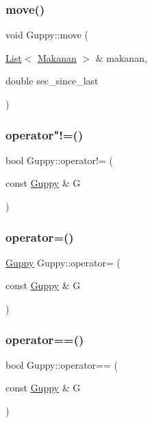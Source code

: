 \mbox{\label{class_guppy_ac6ca65d23a87ab54f0b82f5c45082776}} 
\subsubsection{\texorpdfstring{move()}{move()}}
{\footnotesize\ttfamily void Guppy\+::move (\begin{DoxyParamCaption}\item[{\mbox{\hyperlink{class_list}{List}}$<$ \mbox{\hyperlink{class_makanan}{Makanan}} $>$ \&}]{makanan,  }\item[{double}]{sec\+\_\+since\+\_\+last }\end{DoxyParamCaption})}

\mbox{\label{class_guppy_aa872357ac2df872e8b748066d6b79556}} 
\subsubsection{\texorpdfstring{operator"!=()}{operator!=()}}
{\footnotesize\ttfamily bool Guppy\+::operator!= (\begin{DoxyParamCaption}\item[{const \mbox{\hyperlink{class_guppy}{Guppy}} \&}]{G }\end{DoxyParamCaption})}

\mbox{\label{class_guppy_aa30f6db726124f670123daadb53a581f}} 
\subsubsection{\texorpdfstring{operator=()}{operator=()}}
{\footnotesize\ttfamily \mbox{\hyperlink{class_guppy}{Guppy}} Guppy\+::operator= (\begin{DoxyParamCaption}\item[{const \mbox{\hyperlink{class_guppy}{Guppy}} \&}]{G }\end{DoxyParamCaption})}

\mbox{\label{class_guppy_a02efb73289d3b94264fba7d6c1d985b8}} 
\subsubsection{\texorpdfstring{operator==()}{operator==()}\hspace{0.1cm}{\footnotesize\ttfamily [1/2]}}
{\footnotesize\ttfamily bool Guppy\+::operator== (\begin{DoxyParamCaption}\item[{const \mbox{\hyperlink{class_guppy}{Guppy}} \&}]{G }\end{DoxyParamCaption})}

